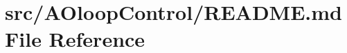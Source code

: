 \hypertarget{src_2AOloopControl_2README_8md}{\section{src/\+A\+Oloop\+Control/\+R\+E\+A\+D\+M\+E.md File Reference}
\label{src_2AOloopControl_2README_8md}
}
